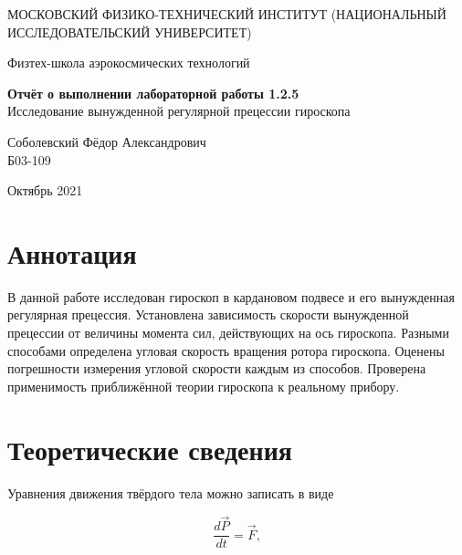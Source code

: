 \documentclass[a4paper,12pt]{article} %
\date{\today}
\begin{document}
\begin{titlepage}
	\begin{center}
		{\large МОСКОВСКИЙ ФИЗИКО-ТЕХНИЧЕСКИЙ ИНСТИТУТ (НАЦИОНАЛЬНЫЙ ИССЛЕДОВАТЕЛЬСКИЙ УНИВЕРСИТЕТ)}
	\end{center}
	\begin{center}
		{\large Физтех-школа аэрокосмических технологий}
	\end{center}
	
	
	\vspace{4.5cm}
	{\huge
		\begin{center}
			{\bf Отчёт о выполнении лабораторной работы 1.2.5}\\
			Исследование вынужденной регулярной прецессии гироскопа
		\end{center}
	}
	\vspace{1cm}
	\begin{center}
		{\large Соболевский Фёдор Александрович \\
			\vspace{0.2cm}
			Б03-109}
	\end{center}
	\vspace{8cm}
	\begin{center}
		Октябрь 2021
	\end{center}
\end{titlepage}

\section{Аннотация}

В данной работе исследован гироскоп в кардановом подвесе и его вынужденная регулярная прецессия. Установлена зависимость скорости вынужденной прецессии от величины момента сил, действующих на ось гироскопа. Разными способами определена угловая скорость вращения ротора гироскопа. Оценены погрешности измерения угловой скорости каждым из способов. Проверена применимость приближённой теории гироскопа к реальному прибору.

\section{Теоретические сведения}

Уравнения движения твёрдого тела можно записать в виде

\begin{equation}
    \frac{d\vec{P}}{dt} = \vec{F},
    \label{NewtonLaw}
\end{equation}
\end{document}
